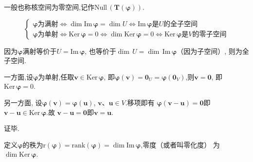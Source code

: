 \begin{red}
\begin{remark}
    一般也称核空间为零空间,记作$\mathrm{Null}\,\left(\bm{T}\left(\bm{\varphi}\right)\right)$.
\end{remark}
\end{red}
\begin{formal}
\begin{proposition}[像空间和核空间对映射的刻画]\label{prop:像空间和核空间对映射的刻画}
    \[
    \begin{cases*}
    \bm{\varphi}\text{为满射}\Longleftrightarrow \dim \mathrm{Im}\,\bm{\varphi}=\dim U\Longleftrightarrow \mathrm{Im}\,\bm{\varphi}
    \text{是}U\text{的全子空间}\\
    \bm{\varphi}\text{为单射}\Longleftrightarrow \mathrm{Ker}\,\bm{\varphi}=0\Longleftrightarrow
    \dim \mathrm{Ker}\,\bm{\varphi}=0\Longleftrightarrow \mathrm{Ker}\,\bm{\varphi}\text{是}
    V\text{的零子空间}
    \end{cases*}\]
\end{proposition}
\begin{Proof}
因为$\bm{\varphi}$满射等价于$U=\mathrm{Im}\,\bm{\varphi}$,
也等价于$\dim\,U=\dim\,\mathrm{Im}\,\bm{\varphi}$（因为子空间）,
则为全子空间.

一方面,设$\bm{\varphi}$为单射,任取$\bm{v}\in \mathrm{Ker}\,\bm{\varphi}$,
即$\bm{\varphi}\left(\bm{v}\right)=\bm{0}_U=
\bm{\varphi}\left(\bm{0}_V\right)$,则$\bm{v}=\bm{0}$,
即$\mathrm{Ker}\,\bm{\varphi}=0.$

另一方面,
设$\bm{\varphi}\left(\bm{v}\right)=\bm{\varphi}\left(\bm{u}\right)$,
$\bm{v}$、$\bm{u}\in V.$移项即有
$\bm{\varphi}\left(\bm{v}-\bm{u}\right)=
\bm{0}$即
$\bm{v}-\bm{u}\in \mathrm{Ker}\,\bm{\varphi}.$故
$\bm{v}-\bm{u}=\bm{0}$即$\bm{v}=\bm{u}.$

证毕.
\end{Proof}
\end{formal}
\begin{formal}
\begin{definition}[秩和零度]\label{def:秩和零度}
    定义$\bm{\varphi}$的秩为$\mathrm{r}\left(\bm{\varphi}\right)=
    \mathrm{rank}\left(\bm{\varphi}
    \right)=\dim \mathrm{Im}\,\bm{\varphi}$,零度（或者叫零化度）
    为$\dim \mathrm{Ker}\,\bm{\varphi}.$
\end{definition}
\end{formal}
